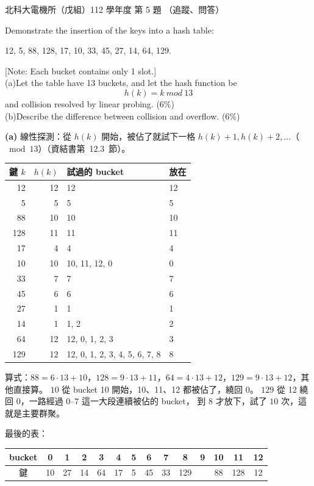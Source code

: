 \begin{pastexam}[label={px:ntut-112-ee-ds-05}]{北科大電機所（戊組）112 學年度 第 5 題}
（追蹤、問答）

Demonstrate the insertion of the keys into a hash table:
\begin{center}12, 5, 88, 128, 17, 10, 33, 45, 27, 14, 64, 129.\end{center}
[Note: Each bucket contains only 1 slot.]\\
(a)Let the table have 13 buckets, and let the hash function be
\[ h(k)=k\ mod\ 13 \]
and collision resolved by linear probing. (6\%)\\
(b)Describe the difference between collision and overflow. (6\%)
\end{pastexam}

\begin{pastsoln}
\textbf{(a)} 線性探測：從 $h(k)$ 開始，被佔了就試下一格 $h(k) + 1, h(k) + 2, \ldots$（$\bmod 13$）（資結書第~12.3~節）。

\begin{center}
\small
\begin{tabular}{rrll}
\toprule
鍵 $k$ & $h(k)$ & 試過的 bucket & 放在 \\
\midrule
12 & 12 & 12 & 12 \\
5 & 5 & 5 & 5 \\
88 & 10 & 10 & 10 \\
128 & 11 & 11 & 11 \\
17 & 4 & 4 & 4 \\
10 & 10 & 10, 11, 12, 0 & 0 \\
33 & 7 & 7 & 7 \\
45 & 6 & 6 & 6 \\
27 & 1 & 1 & 1 \\
14 & 1 & 1, 2 & 2 \\
64 & 12 & 12, 0, 1, 2, 3 & 3 \\
129 & 12 & 12, 0, 1, 2, 3, 4, 5, 6, 7, 8 & 8 \\
\bottomrule
\end{tabular}
\end{center}
算式：$88 = 6 \cdot 13 + 10$，$128 = 9 \cdot 13 + 11$，$64 = 4 \cdot 13 + 12$，$129 = 9 \cdot 13 + 12$，其他直接算。 $10$ 從
bucket 10 開始，10、11、12 都被佔了，繞回 0。 $129$ 從 12 繞回 0，一路經過 $0$--$7$ 這一大段連續被佔的 bucket，
到 8 才放下，試了 $10$ 次，這就是主要群聚。

最後的表：
\begin{center}
\small
\begin{tabular}{c|*{13}{c}}
bucket & 0 & 1 & 2 & 3 & 4 & 5 & 6 & 7 & 8 & 9 & 10 & 11 & 12 \\
\hline
鍵 & 10 & 27 & 14 & 64 & 17 & 5 & 45 & 33 & 129 & & 88 & 128 & 12 \\
\end{tabular}
\end{center}


\end{pastsoln}
